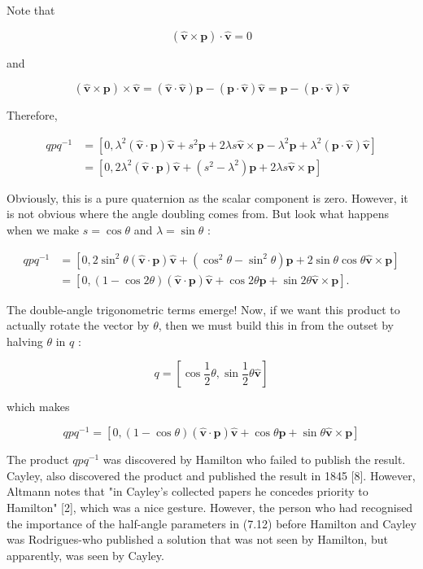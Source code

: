 Note that

$$
(\hat{\mathbf{v}} \times \mathbf{p}) \cdot \hat{\mathbf{v}}=0
$$

and

$$
(\hat{\mathbf{v}} \times \mathbf{p}) \times \hat{\mathbf{v}}=(\hat{\mathbf{v}} \cdot \hat{\mathbf{v}}) \mathbf{p}-(\mathbf{p} \cdot \hat{\mathbf{v}}) \hat{\mathbf{v}}=\mathbf{p}-(\mathbf{p} \cdot \hat{\mathbf{v}}) \hat{\mathbf{v}}
$$

Therefore,

$$
\begin{aligned}
q p q^{-1} & =\left[0, \lambda^{2}(\hat{\mathbf{v}} \cdot \mathbf{p}) \hat{\mathbf{v}}+s^{2} \mathbf{p}+2 \lambda s \hat{\mathbf{v}} \times \mathbf{p}-\lambda^{2} \mathbf{p}+\lambda^{2}(\mathbf{p} \cdot \hat{\mathbf{v}}) \hat{\mathbf{v}}\right] \\
& =\left[0,2 \lambda^{2}(\hat{\mathbf{v}} \cdot \mathbf{p}) \hat{\mathbf{v}}+\left(s^{2}-\lambda^{2}\right) \mathbf{p}+2 \lambda s \hat{\mathbf{v}} \times \mathbf{p}\right]
\end{aligned}
$$

Obviously, this is a pure quaternion as the scalar component is zero. However, it is not obvious where the angle doubling comes from. But look what happens when we make $s=\cos \theta$ and $\lambda=\sin \theta$ :

$$
\begin{aligned}
q p q^{-1} & =\left[0,2 \sin ^{2} \theta(\hat{\mathbf{v}} \cdot \mathbf{p}) \hat{\mathbf{v}}+\left(\cos ^{2} \theta-\sin ^{2} \theta\right) \mathbf{p}+2 \sin \theta \cos \theta \hat{\mathbf{v}} \times \mathbf{p}\right] \\
& =[0,(1-\cos 2 \theta)(\hat{\mathbf{v}} \cdot \mathbf{p}) \hat{\mathbf{v}}+\cos 2 \theta \mathbf{p}+\sin 2 \theta \hat{\mathbf{v}} \times \mathbf{p}] .
\end{aligned}
$$

The double-angle trigonometric terms emerge! Now, if we want this product to actually rotate the vector by $\theta$, then we must build this in from the outset by halving $\theta$ in $q$ :

$$
q=\left[\cos \frac{1}{2} \theta, \sin \frac{1}{2} \theta \hat{\mathbf{v}}\right]
$$

which makes

$$
q p q^{-1}=[0,(1-\cos \theta)(\hat{\mathbf{v}} \cdot \mathbf{p}) \hat{\mathbf{v}}+\cos \theta \mathbf{p}+\sin \theta \hat{\mathbf{v}} \times \mathbf{p}]
$$

The product $q p q^{-1}$ was discovered by Hamilton who failed to publish the result. Cayley, also discovered the product and published the result in 1845 [8]. However, Altmann notes that "in Cayley's collected papers he concedes priority to Hamilton" [2], which was a nice gesture. However, the person who had recognised the importance of the half-angle parameters in (7.12) before Hamilton and Cayley was Rodrigues-who published a solution that was not seen by Hamilton, but apparently, was seen by Cayley.

